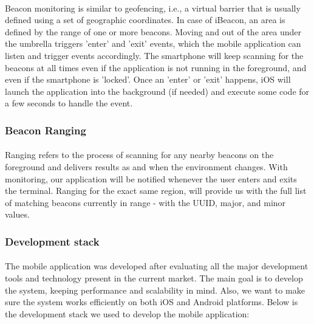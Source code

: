 \documentclass[12pt]{article}
\begin{document}
\paragraph{}Beacon monitoring is similar to geofencing, i.e., a virtual barrier that is usually defined using a set of geographic coordinates. In case of iBeacon, an area is defined by the range of one or more beacons. Moving and out of the area under the umbrella triggers ’enter’ and ’exit’ events, which the mobile application can listen and trigger events accordingly. The smartphone will keep scanning for the beacons at all times even if the application is not running in the foreground, and even if the smartphone is 'locked'. Once an ’enter’ or ’exit’ happens, iOS will launch the application into the background (if needed) and execute some code for a few seconds to handle the event.

\subsubsection{Beacon Ranging}
\paragraph{} Ranging refers to the process of scanning for any nearby beacons on the foreground and delivers results as and when the environment changes. With monitoring, our application will be notified whenever the user enters and exits the terminal. Ranging for the exact same region, will provide us with the full list of matching beacons currently in range - with the UUID, major, and minor values.

\subsubsection{Development stack}
\paragraph{} The mobile application was developed after evaluating all the major development tools and technology present in the current market. The main goal is to develop the system, keeping performance and scalability in mind. Also, we want to make sure the system works efficiently on both iOS and Android platforms. Below is the development stack we used to develop the mobile application:
\end{document}
